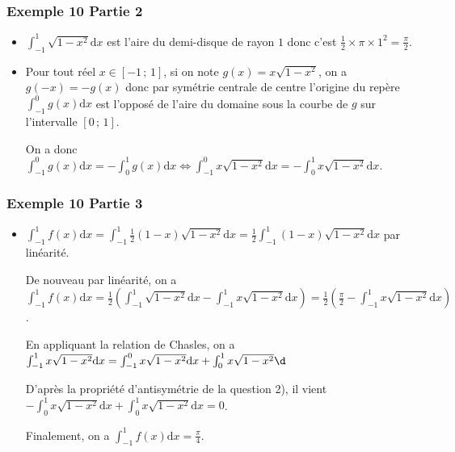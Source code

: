 \documentclass[11pt, hyperref={urlcolor=red,%
            linkcolor=blue, %
            colorlinks=true}]{beamer}
\newcommand{\Interff}[2]{\left[#1\, ;\, #2\right]}
\newcommand{\dx}{\ensuremath{\text{d}x}}		%
\begin{document}
\begin{frame}
\frametitle{Exemple  10 Partie 2}
\label{exemple10}

\begin{itemize}
	\item  $\displaystyle\int_{-1}^{1}\sqrt{1-x^2}\dx$  est l'aire du demi-disque de rayon $1$ donc c'est $\frac{1}{2}\times \pi \times 1^{2}=\frac{\pi}{2}$.
	\item Pour tout réel $x \in \Interff{-1}{1}$, si on note $g(x)= x\sqrt{1-x^2}$, on a$g(-x)=-g(x)$ donc par symétrie centrale de centre l'origine du repère  $\int_{-1}^{0}g(x)\dx$ est l'opposé de l'aire du domaine sous la courbe de $g$  sur l'intervalle $\Interff{0}{1}$.

On a donc $\int_{-1}^{0}g(x)\dx = -\int_{0}^{1}g(x)\dx \Leftrightarrow  \displaystyle\int_{-1}^{0}x\sqrt{1-x^2}\dx=-\displaystyle\int_{0}^{1}x\sqrt{1-x^2}\dx $.


\end{itemize}


\end{frame}



\begin{frame}
\frametitle{Exemple  10 Partie 3}
\label{exemple10}

\begin{itemize}
	
\item $\displaystyle\int_{-1}^{1}f(x)\dx = \displaystyle\int_{-1}^{1}\frac{1}{2}(1-x)\sqrt{1-x^2} \dx =\frac{1}{2}\displaystyle\int_{-1}^{1}(1-x)\sqrt{1-x^2} \dx$ par linéarité.

De nouveau par linéarité, on a $\displaystyle\int_{-1}^{1}f(x)\dx =\frac{1}{2}\left(\int_{-1}^{1}\sqrt{1-x^2} \dx - \int_{-1}^{1}x\sqrt{1-x^2} \dx\right) = \frac{1}{2}\left(\frac{\pi}{2}-  \int_{-1}^{1}x\sqrt{1-x^2}\dx \right) $.

En appliquant la relation de Chasles, on a  $ \int_{-1}^{1}x\sqrt{1-x^2}\dx = \int_{-1}^{0}x\sqrt{1-x^2}\dx + \int_{0}^{1}x\sqrt{1-x^2}\d$

D'après la propriété d'antisymétrie de la question 2), il vient $-\int_{0}^{1}x\sqrt{1-x^2}\dx +  \int_{0}^{1}x\sqrt{1-x^2}\dx=0$.

Finalement, on a  $\boxed{\displaystyle\int_{-1}^{1}f(x)\dx = \frac{\pi}{4}}$.

\end{itemize}


\end{frame}
\end{document}
